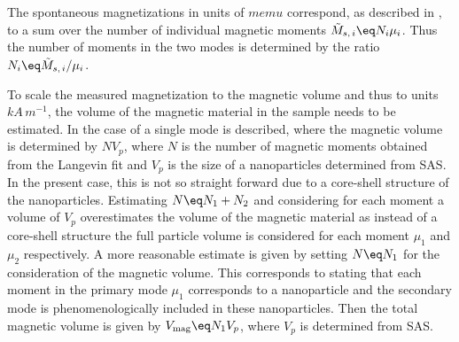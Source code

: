 \documentclass[\main/dresen_thesis.tex]{subfiles}
\begin{document}
    The spontaneous magnetizations in units of $\unit{memu}$ correspond, as described in , to a sum over the number of individual magnetic moments $\tilde{M}_{s,\,i} \eq N_i \mu_i$.
    Thus the number of moments in the two modes is determined by the ratio $N_i \eq \tilde{M}_{s,\,i} / \mu_i$.

    To scale the measured magnetization to the magnetic volume and thus to units $\unit{kA \, m^{-1}}$, the volume of the magnetic material in the sample needs to be estimated.
    In  the case of a single mode is described, where the magnetic volume is determined by $N V_p$, where $N$ is the number of magnetic moments obtained from the Langevin fit and $V_p$ is the size of a nanoparticles determined from SAS.
    In the present case, this is not so straight forward due to a core-shell structure of the nanoparticles.
    Estimating $N \eq N_1 + N_2$ and considering for each moment a volume of $V_p$ overestimates the volume of the magnetic material as instead of a core-shell structure the full particle volume is considered for each moment $\mu_1$ and $\mu_2$ respectively.
    A more reasonable estimate is given by setting $N \eq N_1$ for the consideration of the magnetic volume.
    This corresponds to stating that each moment in the primary mode $\mu_1$ corresponds to a nanoparticle and the secondary mode is phenomenologically included in these nanoparticles.
    Then the total magnetic volume is given by $V_\mathrm{mag} \eq N_1 V_p$, where $V_p$ is determined from SAS.
\end{document}

